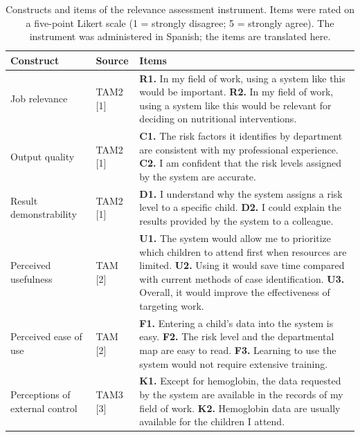 \documentclass[11pt]{article}
\begin{document}
\clearpage
\begin{table}[h]
\caption{Constructs and items of the relevance assessment instrument. Items were rated on a five-point Likert scale
(1 = strongly disagree; 5 = strongly agree). The instrument was administered in Spanish; the items are translated
here.}
\small
\begin{tabularx}{\linewidth}{@{}p{3.2cm}p{1.65cm}L@{}}
\toprule
Construct & Source & Items \\
\midrule
Job relevance & TAM2 [1] &
\textbf{R1.} In my field of work, using a system like this would be important.\newline
\textbf{R2.} In my field of work, using a system like this would be relevant for deciding on nutritional interventions. \\
Output quality & TAM2 [1] &
\textbf{C1.} The risk factors it identifies by department are consistent with my professional experience.\newline
\textbf{C2.} I am confident that the risk levels assigned by the system are accurate. \\
Result demonstrability & TAM2 [1] &
\textbf{D1.} I understand why the system assigns a risk level to a specific child.\newline
\textbf{D2.} I could explain the results provided by the system to a colleague. \\
Perceived usefulness & TAM [2] &
\textbf{U1.} The system would allow me to prioritize which children to attend first when resources are limited.\newline
\textbf{U2.} Using it would save time compared with current methods of case identification.\newline
\textbf{U3.} Overall, it would improve the effectiveness of targeting work. \\
Perceived ease of use & TAM [2] &
\textbf{F1.} Entering a child's data into the system is easy.\newline
\textbf{F2.} The risk level and the departmental map are easy to read.\newline
\textbf{F3.} Learning to use the system would not require extensive training. \\
Perceptions of external control & TAM3 [3] &
\textbf{K1.} Except for hemoglobin, the data requested by the system are available in the records of my field of work.\newline
\textbf{K2.} Hemoglobin data are usually available for the children I attend.\newline

\end{tabularx}
\end{table}
\end{document}
